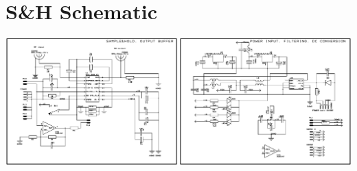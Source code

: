 \documentclass[a4paper, 10pt]{article}
\begin{document}
\vspace{10em}
\appendix

\section{S\&H Schematic}\label{sec:sample-hold-schema}
\includegraphics[width=\textwidth]{./appendices/S&H_Scheme.pdf}
\end{document}
